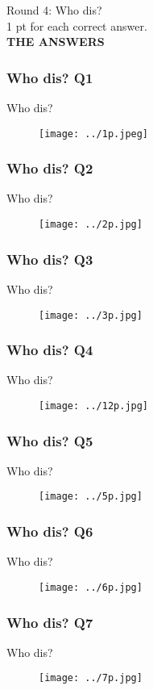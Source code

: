 \documentclass{beamer}
\begin{document}
\begin{frame}
\centering
\Huge
Round 4: Who dis?\\

\small
1 pt for each correct answer.\\
\textbf{THE ANSWERS}
\end{frame}


\begin{frame}
\frametitle{Who dis? Q1}
Who dis?
\begin{figure}
\texttt{[image: ../1p.jpeg]}
\end{figure}

\end{frame}
\begin{frame}
\frametitle{Who dis? Q2}
Who dis?
\begin{figure}
\texttt{[image: ../2p.jpg]}
\end{figure}

\end{frame}
\begin{frame}
\frametitle{Who dis? Q3}
Who dis?
\begin{figure}
\texttt{[image: ../3p.jpg]}
\end{figure}

\end{frame}

\begin{frame}
\frametitle{Who dis? Q4}
Who dis?
\begin{figure}
\texttt{[image: ../12p.jpg]}
\end{figure}

\end{frame}
\begin{frame}
\frametitle{Who dis? Q5}
Who dis?
\begin{figure}
\texttt{[image: ../5p.jpg]}
\end{figure}

\end{frame}

\begin{frame}
\frametitle{Who dis? Q6}
Who dis?
\begin{figure}
\texttt{[image: ../6p.jpg]}
\end{figure}

\end{frame}



\begin{frame}
\frametitle{Who dis? Q7}
Who dis?
\begin{figure}
\texttt{[image: ../7p.jpg]}
\end{figure}

\end{frame}
\end{document}
